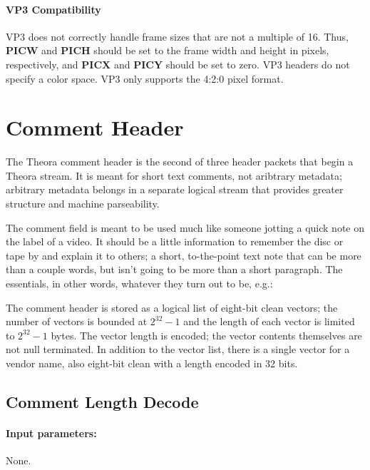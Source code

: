 \documentclass[9pt,letterpaper]{book}
\newcommand{\bitvar}[1]{\ensuremath{\mathbf{\bm{#1}}}}
\numberwithin{equation}{chapter}
\numberwithin{figure}{chapter}
\numberwithin{table}{chapter}
\begin{document}
\paragraph{VP3 Compatibility}

VP3 does not correctly handle frame sizes that are not a multiple of 16.
Thus, \bitvar{PICW} and \bitvar{PICH} should be set to the frame width and
 height in pixels, respectively, and \bitvar{PICX} and \bitvar{PICY} should be
 set to zero.
VP3 headers do not specify a color space.
VP3 only supports the 4:2:0 pixel format.

\section{Comment Header}
\label{sec:commentheader}

The Theora comment header is the second of three header packets that begin a
 Theora stream.
It is meant for short text comments, not aribtrary metadata; arbitrary metadata
 belongs in a separate logical stream that provides greater structure and
 machine parseability.

The comment field is meant to be used much like someone jotting a quick note on
 the label of a video.
It should be a little information to remember the disc or tape by and explain it to
 others; a short, to-the-point text note that can be more than a couple words,
 but isn't going to be more than a short paragraph.
The essentials, in other words, whatever they turn out to be, e.g.:


The comment header is stored as a logical list of eight-bit clean vectors; the
 number of vectors is bounded at $2^{32}-1$ and the length of each vector is
 limited to $2^{32}-1$ bytes.
The vector length is encoded; the vector contents themselves are not null
 terminated.
In addition to the vector list, there is a single vector for a vendor name,
 also eight-bit clean with a length encoded in 32 bits.

\subsection{Comment Length Decode}
\label{sub:comment-len}

\paragraph{Input parameters:} None.
\end{document}
